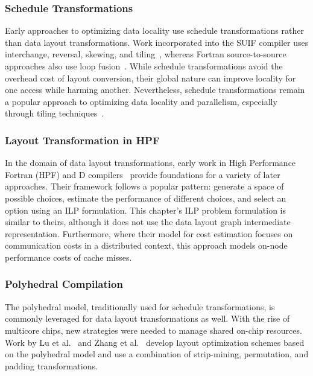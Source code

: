 \subsubsection{Schedule Transformations}
Early approaches to optimizing data locality use schedule transformations rather than data layout transformations. 
Work incorporated into the SUIF compiler uses interchange, reversal, skewing, and tiling~\cite{wolf1991data}, whereas Fortran source-to-source approaches also use loop fusion~\cite{mckinley1996improving}.
While schedule transformations avoid the overhead cost of layout conversion, their global nature can improve locality for one access while harming another.
Nevertheless, schedule transformations remain a popular approach to optimizing data locality and parallelism, 
especially through tiling techniques~\cite{bondhugula2008pluto,bertolacci2015parameterized,bondhugula2016diamond,bandishti2012tiling,unat2016tida}.

\subsubsection{Layout Transformation in HPF}
In the domain of data layout transformations, early work in High Performance Fortran (HPF) and D compilers~\cite{bixby1994automatic,kennedy1995automatic,kennedy1998automatic} provide foundations for a variety of later approaches.
Their framework follows a popular pattern: generate a space of possible choices, estimate the performance of different choices, and select an option using an ILP formulation. 
This chapter's ILP problem formulation is similar to theirs, although it does not use the data layout graph intermediate representation.
Furthermore, where their model for cost estimation focuses on communication costs in a distributed context, this approach models on-node performance costs of cache misses.

\subsubsection{Polyhedral Compilation}
The polyhedral model, traditionally used for schedule transformations, is commonly leveraged for data layout transformations as well.
With the rise of multicore chips, new strategies were needed to manage shared on-chip resources. 
Work by Lu et al.~\cite{lu2009data} and Zhang et al.~\cite{zhang2011optimizing} develop layout optimization schemes based on the polyhedral model and use a combination of strip-mining, permutation, and padding transformations.

